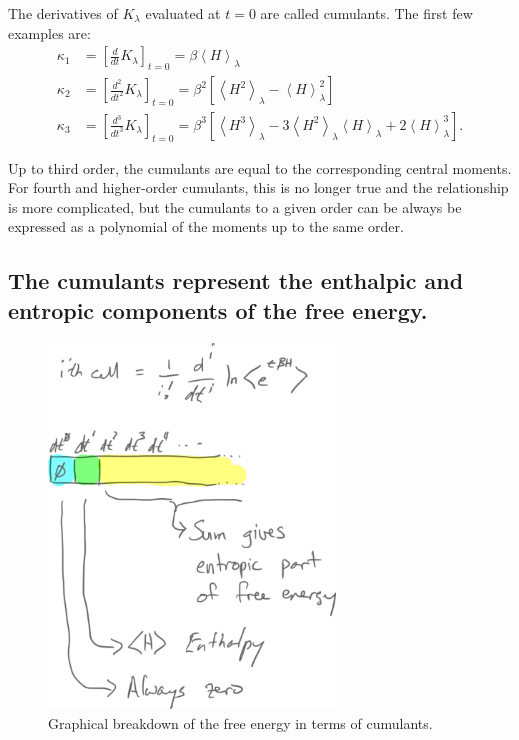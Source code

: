 \documentclass{article}
\begin{document}
The derivatives of $K_{\lambda}$ evaluated at $t=0$ are called cumulants. The first few examples are:
\begin{align}
\kappa_1 &=
	\left[\frac{d}{dt} K_{\lambda}\right]_{t=0} =
	\beta \left\langle H \right\rangle_\lambda \nonumber\\
\kappa_2 &=
	\left[\frac{d^2}{dt^2} K_{\lambda}\right]_{t=0} =
	\beta^2 \left[
		\left\langle H^2 \right\rangle_\lambda -
    	\left\langle H \right\rangle_\lambda^2
    \right] \nonumber\\
\kappa_3 &=
	\left[\frac{d^3}{dt^3} K_{\lambda} \right]_{t=0} =
	\beta^3 \left[
		\left\langle H^3 \right\rangle_\lambda -
    	3 \left\langle H^2 \right\rangle_\lambda
    		\left\langle H \right\rangle_\lambda +
    	2 \left\langle H \right\rangle_\lambda^3
    \right].
\label{eq:cumu}
\end{align}

Up to third order, the cumulants are equal to the corresponding central moments. For fourth and higher-order cumulants, this is no longer true and the relationship is more complicated, but the cumulants to a given order can be always be expressed as a polynomial of the moments up to the same order.





\subsection{The cumulants represent the enthalpic and entropic components of the free energy.}

\begin{figure}[htb]
\centering
\includegraphics[width=3in]{figure1.pdf}
\caption{Graphical breakdown of the free energy in terms of cumulants.}
\label{fig:1D}
\end{figure}
\end{document}
